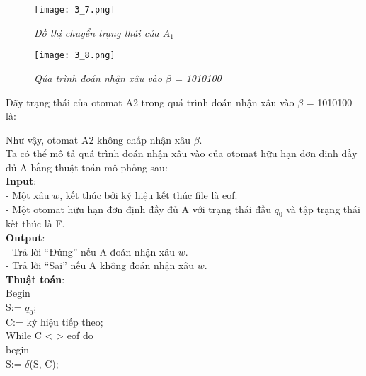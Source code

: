 \begin{flushleft}
\begin{figure}[ht]
\texttt{[image: 3\_7.png]}
\caption{ \textit{Đồ thị chuyển trạng thái của $A_1$} }
\end{figure}
\end{flushleft}

\begin{figure}[ht]
\texttt{[image: 3\_8.png]}
\caption{ \textit{Qúa trình đoán nhận xâu vào $\beta$ = 1010100} }
\end{figure}

\begin{flushleft}
Dãy trạng thái của otomat A2 trong quá trình đoán nhận xâu vào $\beta$ = 1010100 là:
\end{flushleft}

\begin{flushleft}
Như vậy, otomat A2 không chấp nhận xâu $\beta$.\\
Ta có thể mô tả quá trình đoán nhận xâu vào của otomat hữu hạn đơn định đầy đủ A bằng thuật toán mô phỏng sau:\\
\hspace{10mm} \textbf{Input}:\\
\hspace{10mm} - Một xâu $w$, kết thúc bởi ký hiệu kết thúc file là eof.\\
\hspace{10mm} - Một otomat hữu hạn đơn định đầy đủ A với trạng thái đầu $q_0$ và tập trạng thái kết thúc là F.\\
\hspace{10mm} \textbf{Output}:\\
\hspace{10mm} - Trả lời “Đúng” nếu A đoán nhận xâu $w$.\\
\hspace{10mm} - Trả lời “Sai” nếu A không đoán nhận xâu $w$.\\
\hspace{10mm} \textbf{Thuật toán}:\\
Begin\\
\hspace{10mm} S:= $q_0$;\\
\hspace{10mm} C:= ký hiệu tiếp theo;\\
\hspace{10mm} While C < > eof do\\
\hspace{20mm} begin\\
\hspace{30mm} S:= $\delta$(S, C);\\

\end{flushleft}

